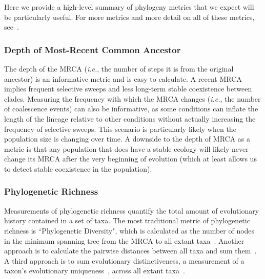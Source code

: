 \documentclass[letterpaper]{article}
\begin{document}
Here we provide a high-level summary of phylogeny metrics that we expect will be particularly useful. For more metrics and more detail on all of these metrics, see~\citep{winter_phylogenetic_2013, tucker_guide_2017}. 

\subsubsection{Depth of Most-Recent Common Ancestor}

The depth of the MRCA %
(\textit{i.e.}, the number of steps it is from the original ancestor)
is an informative metric and is easy to calculate.
A recent MRCA implies frequent selective sweeps and less long-term stable coexistence between clades. %
Measuring the frequency with which the MRCA changes (\textit{i.e.}, the number of coalescence events) can also be informative, as some conditions can inflate the length of the lineage relative to other conditions without actually increasing the frequency of selective sweeps. This scenario is particularly likely when the population size is changing over time. A downside to the depth of MRCA as a metric is that any population that does have a stable ecology will likely never change its MRCA after the very beginning of evolution %
(which at least allows us to detect stable coexistence in the population).

\subsubsection{Phylogenetic Richness}

Measurements of phylogenetic richness quantify the total amount of evolutionary history contained in a set of taxa. The most traditional metric of phylogenetic richness is
``Phylogenetic Diversity", which is calculated as the number of nodes in the minimum spanning tree from the MRCA to all extant taxa~\citep{faith_conservation_1992}. Another approach is to calculate the pairwise distances between all taxa and sum them~\citep{tucker_guide_2017}. A third approach is to sum evolutionary distinctiveness, a measurement of a taxon's evolutionary uniqueness~\citep{isaac_mammals_2007}, across all extant taxa~\citep{tucker_guide_2017}.
\end{document}

